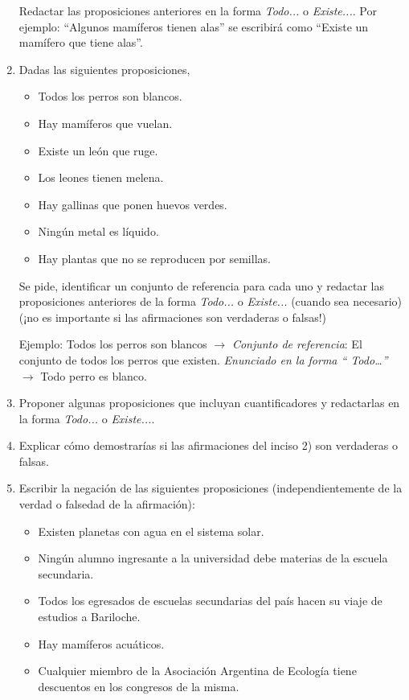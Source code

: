 \documentclass[12pt]{article}
\theoremstyle{definition}
\theoremstyle{remark}
\begin{document}
\begin{enumerate}
Redactar las proposiciones anteriores en la forma \textit{Todo...} o \textit{Existe...}. Por ejemplo: “Algunos mamíferos tienen alas” se escribirá como “Existe un mamífero que tiene alas”. 

\item Dadas las siguientes proposiciones,
 \begin{multicols}{2}
 \begin{itemize}
 \setlength\itemsep{0em}
     	\item Todos los perros son blancos.
	\item Hay mamíferos que vuelan.
	\item Existe un león que ruge.
	\item Los leones tienen melena.
	\item Hay gallinas que ponen huevos verdes.
	\item Ningún metal es líquido.
	\item Hay plantas que no se reproducen por semillas.
  \end{itemize}
\end{multicols}
 Se pide, identificar un conjunto de referencia para cada uno  y redactar las proposiciones anteriores de la forma  \textit{Todo...} o \textit{Existe...} (cuando sea necesario)(¡no es importante si las afirmaciones son verdaderas o falsas!)

Ejemplo: Todos los perros son blancos $\rightarrow$  \textit{Conjunto de referencia}: El conjunto de todos los perros que existen. \textit{Enunciado en la forma “ Todo…” }  $\rightarrow$ Todo perro es blanco.

\item Proponer algunas proposiciones que incluyan cuantificadores y redactarlas en la forma   \textit{Todo...} o \textit{Existe...}.

\item Explicar cómo demostrarías si las afirmaciones del inciso 2) son verdaderas o falsas.

\item Escribir la negación de las siguientes proposiciones (independientemente de la verdad o falsedad de la afirmación):
\begin{itemize}
\setlength\itemsep{0em}
	\item Existen planetas con agua en el sistema solar.
	\item Ningún alumno ingresante a la universidad debe materias de la escuela secundaria.
	\item Todos los egresados de escuelas secundarias del país hacen su viaje de estudios a Bariloche.
	\item Hay mamíferos acuáticos.
	\item Cualquier miembro de la Asociación Argentina de Ecología tiene descuentos en los congresos de la misma. 
\end{itemize}


\end{enumerate}
\end{document}
